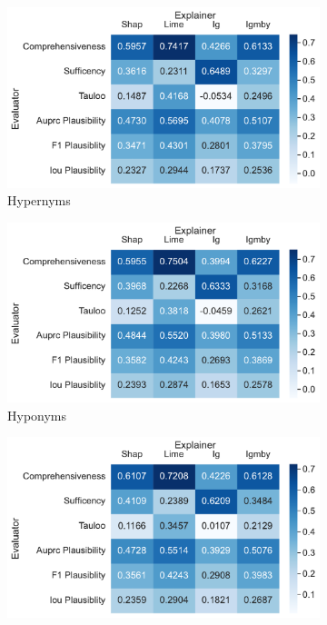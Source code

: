 \begin{figure}[t!]
\begin{subfigure}{0.49\textwidth}
        \includegraphics[width=\textwidth]{./images/ferret_heatmaps_phenomena/filtered_3_3_longer/hypernym.pdf}
        \caption{Hypernyms}
    \end{subfigure}
    \begin{subfigure}{0.49\textwidth}
        \includegraphics[width=\textwidth]{./images/ferret_heatmaps_phenomena/filtered_3_3_longer/hyponym.pdf}
        \caption{Hyponyms}
    \end{subfigure}
    \begin{subfigure}{0.49\textwidth}
        \includegraphics[width=\textwidth]{./images/ferret_heatmaps_phenomena/filtered_3_3_longer/co_hyponym.pdf}

\end{subfigure}
\end{figure}
